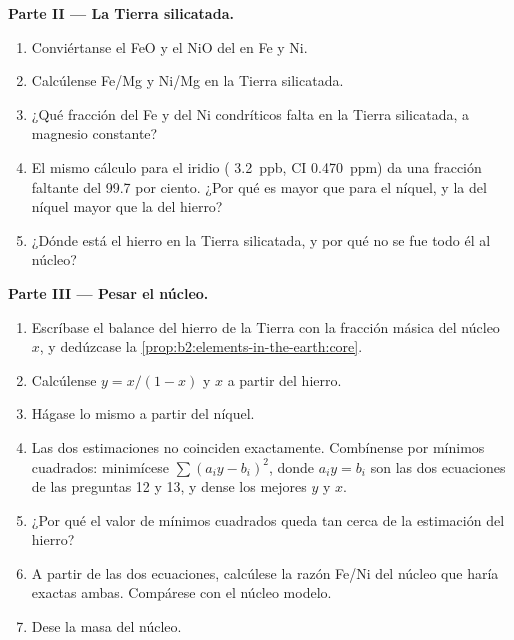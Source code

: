 \begin{problem}
\noindent\textbf{Parte II --- La Tierra silicatada.}
\begin{enumerate}[resume]
\item Conviértanse el FeO y el NiO del  en Fe y Ni.
\item Calcúlense Fe/Mg y Ni/Mg en la Tierra silicatada.
\item ¿Qué fracción del Fe y del Ni condríticos falta en la Tierra
silicatada, a magnesio constante?
\item El mismo cálculo para el iridio ( \qty{3.2}{ppb}, CI
\qty{0.470}{ppm}) da una fracción faltante del 99.7 por ciento. ¿Por qué es mayor
que para el níquel, y la del níquel mayor que la del hierro?
\item ¿Dónde está el hierro en la Tierra silicatada, y por qué no se fue todo él al
núcleo?
\end{enumerate}

\noindent\textbf{Parte III --- Pesar el núcleo.}
\begin{enumerate}[resume]
\item Escríbase el balance del hierro de la Tierra con la fracción másica del núcleo $x$, y
dedúzcase la \cref{prop:b2:elements-in-the-earth:core}.
\item Calcúlense $y = x/(1-x)$ y $x$ a partir del hierro.
\item Hágase lo mismo a partir del níquel.
\item Las dos estimaciones no coinciden exactamente. Combínense por mínimos cuadrados:
minimícese $\sum (a_iy - b_i)^2$, donde $a_i y = b_i$ son las dos ecuaciones de las
preguntas 12 y 13, y dense los mejores $y$ y $x$.
\item ¿Por qué el valor de mínimos cuadrados queda tan cerca de la estimación del hierro?
\item A partir de las dos ecuaciones, calcúlese la razón Fe/Ni del núcleo que haría
exactas ambas. Compárese con el núcleo modelo.
\item Dese la masa del núcleo.
\end{enumerate}


\end{problem}
